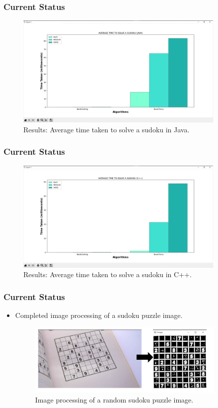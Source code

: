 \documentclass{beamer}
\begin{document}
\begin{frame}
     \frametitle{Current Status}   
		  \begin{figure}
		  \includegraphics[width=0.9\textwidth]{./week7_img/graph_java.png}
		  \caption{Results: Average time taken to solve a sudoku in Java.}
		  \centering
		  \end{figure}
\end{frame}

\begin{frame}
     \frametitle{Current Status}   
		  \begin{figure}
		  \includegraphics[width=0.9\textwidth]{./week7_img/graph_C++.png}
		  \caption{Results: Average time taken to solve a sudoku in C++.}
		  \centering
		  \end{figure}
\end{frame}

\begin{frame}
	\frametitle{Current Status}
	\begin{itemize}
	    \item Completed image processing of a sudoku puzzle image.  
		  \begin{figure}
		  \includegraphics[width=0.9\textwidth]{./week7_img/image_processed.png}
		  \caption{Image processing of a random sudoku puzzle image.}
		  \centering
		  \end{figure}
	\end{itemize}
\end{frame}
\end{document}
